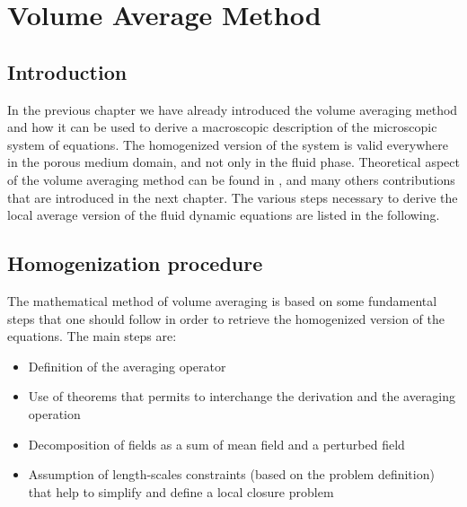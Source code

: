 \chapter{Volume Average Method}
\label{ch:vans}


\section{Introduction}

In the previous chapter we have already introduced the volume averaging method and how it can be used to derive a macroscopic description of the microscopic system of equations.
The homogenized version of the system is valid everywhere in the porous medium domain, and not only in the fluid phase.
Theoretical aspect of the volume averaging method can be found in \citet{whitaker2013method} \cite{whitaker1986flow} \cite{whitaker1996forchheimer}, \citet{quintard1994transport1} \cite{quintard1994transport2} \cite{quintard1994transport3} \cite{quintard1994transport4} \cite{quintard1994transport5} and many others contributions that are introduced in the next chapter.
The various steps necessary to derive the local average version of the fluid dynamic equations are listed in the following.

\section{Homogenization procedure}
The mathematical method of volume averaging is based on some fundamental steps that one should follow in order to retrieve the homogenized version of the equations.
The main steps are:
\begin{itemize}
\item Definition of the averaging operator
\item Use of theorems that permits to interchange the derivation and the averaging operation
\item Decomposition of fields as a sum of mean field and a perturbed field
\item Assumption of length-scales constraints (based on the problem definition) that help to simplify and define a local closure  problem
\end{itemize}

